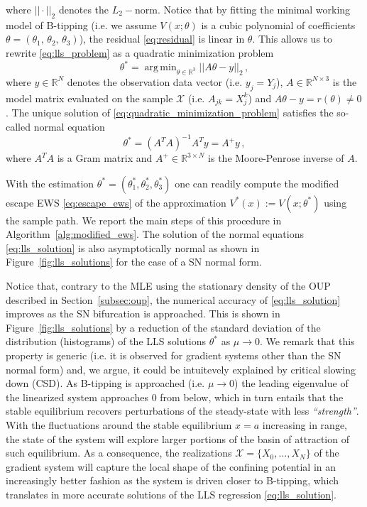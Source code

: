 \documentclass[a4paper,fleqn]{cas-sc}
\DeclareMathOperator*{\argmin}{\arg\,min}
\newcommand{\sref}[1]{Section~\ref{#1}}
\newcommand{\fref}[1]{Figure~\ref{#1}}
\begin{document}
%
where $||\cdot||_2$ denotes the $L_2-$norm.
Notice that by fitting the minimal working model of B-tipping (i.e. we assume $V(x;\theta)$ is a cubic polynomial of coefficients $\theta = (\theta_{1},\, \theta_{2},\, \theta_{3})$), the residual \eqref{eq:residual} is linear in $\theta$.
This allows us to rewrite \eqref{eq:lls_problem} as a quadratic minimization problem
%
\begin{equation}\label{eq:quadratic_minimization_problem}
        \theta^{*} = \argmin_{\theta\in \mathbb{R}^{3}}||A\theta - y||_2\,,
\end{equation}
%
where $y\in \mathbb{R}^{N}$ denotes the observation data vector (i.e. $y_j = Y_j$), $A\in \mathbb{R}^{N\times3}$ is the model matrix evaluated on the sample $\mathcal{X}$ (i.e. $A_{jk} = X_{j}^{k}$) and $A\theta - y = r(\theta) \neq 0$.
The unique solution of \eqref{eq:quadratic_minimization_problem} satisfies the so-called normal equation
%
\begin{equation}\label{eq:lls_solution}
        \theta^{*} = (A^{T}A)^{-1}A^{T}y = A^{+}y\,,
\end{equation}
%
where $A^TA$ is a Gram matrix and $A^{+}\in\mathbb{R}^{3\times N}$ is the Moore-Penrose inverse of $A$.

With the estimation $\theta^*=(\theta^*_1, \theta^*_2, \theta^*_3)$ one can readily compute the modified escape EWS \eqref{eq:escape_ews} of the approximation $V^*(x):=V(x;\theta^*)$ using the sample path. We report the main steps of this procedure in Algorithm~\ref{alg:modified_ews}.
The solution of the normal equations \eqref{eq:lls_solution} is also asymptotically normal as shown in \fref{fig:lls_solutions} for the case of a SN normal form.

Notice that, contrary to the MLE using the stationary density of the OUP described in \sref{subsec:oup}, the numerical accuracy of \eqref{eq:lls_solution} improves as the SN bifurcation is approached.
This is shown in \fref{fig:lls_solutions} by a reduction of the standard deviation of the distribution (histograms) of the LLS solutions $\theta^*$ as $\mu\to0$.
We remark that this property is generic (i.e. it is observed for gradient systems other than the SN normal form) and, we argue, it could be intuitevely explained by critical slowing down (CSD).
As B-tipping is approached (i.e. $\mu\to0$) the leading eigenvalue of the linearized system approaches $0$ from below, which in turn entails that the stable equilibrium recovers perturbations of the steady-state with less \textit{``strength''}.
With the fluctuations around the stable equilibrium $x=a$ increasing in range, the state of the system will explore larger portions of the basin of attraction of such equilibrium.
As a consequence, the realizations $\mathcal{X} = \{X_0,\dots,X_N\}$ of the gradient system will capture the local shape of the confining potential in an increasingly better fashion as the system is driven closer to B-tipping, which translates in more accurate solutions of the LLS regression \eqref{eq:lls_solution}.
\end{document}
